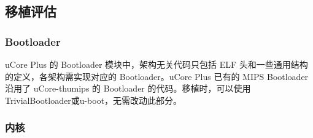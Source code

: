 \subsection{移植评估}

\subsubsection{Bootloader}
uCore Plus 的 Bootloader 模块中，架构无关代码只包括 ELF 头和一些通用结构的定义，各架构需实现对应的 Bootloader。uCore Plus 已有的 MIPS Bootloader 沿用了 uCore-thumips 的 Bootloader 的代码。移植时，可以使用TrivialBootloader或u-boot，无需改动此部分。

\subsubsection{内核}
